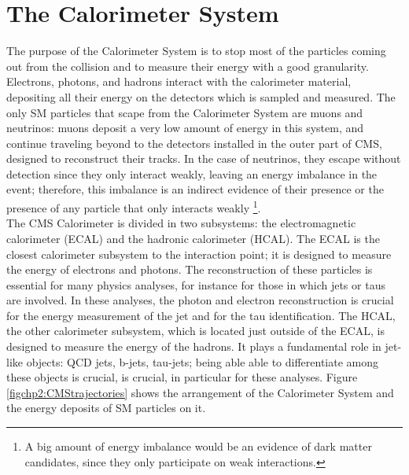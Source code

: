 \section{The Calorimeter System}

\noindent The purpose of the Calorimeter System is to stop most of the particles 
coming out from the collision and to measure their energy with a good 
granularity. Electrons, photons, and hadrons interact with the calorimeter 
material, depositing all their energy on the detectors which is sampled
and measured. The only SM particles that scape from the Calorimeter System are 
muons and neutrinos: muons deposit a very low amount of energy in this system, and 
continue traveling beyond to the detectors installed in the outer part of CMS, 
designed to reconstruct their tracks. In the case of neutrinos, they escape without detection
since they only interact weakly, leaving an energy imbalance in the event; therefore, this imbalance 
is an indirect evidence of their presence or the presence of any particle that only interacts weakly \footnote[1]{A big amount of energy 
imbalance would be an evidence of dark matter candidates, since they only participate on weak interactions.}. \\

\noindent The CMS Calorimeter is divided in two subsystems: the electromagnetic calorimeter (ECAL) and 
the hadronic calorimeter (HCAL). The ECAL is the closest calorimeter subsystem to the interaction point; 
it is designed to measure the energy of electrons and photons. The reconstruction of these particles 
is essential for many physics analyses, for instance for those in which 
jets or taus are involved. In these analyses, the photon and electron 
reconstruction is crucial for the energy measurement of the jet and for 
the tau identification. The HCAL, the other calorimeter subsystem, which is located 
just outside of the ECAL, is designed to measure the energy of the hadrons. It plays a fundamental
role in jet-like objects: QCD jets, b-jets, tau-jets; being able able to differentiate 
among these objects is crucial, is crucial, in particular for these analyses. Figure \ref{figchp2:CMStrajectories} 
shows the arrangement of the Calorimeter System and the energy deposits of SM particles on it.




